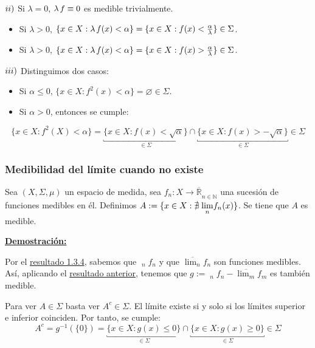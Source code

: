 \documentclass[12pt,a4paper]{article}
\newcommand{\R}{\mathbb{R}}
\newcommand{\N}{\mathbb{N}}
\newcommand{\linf}[1]{\displaystyle{\mathop{\underline{\lim}}_{#1}}}
\newcommand{\mlim}[1]{\displaystyle{\lim_{#1}}}
\newcounter{unit}[section]
\newcounter{chapter}[unit]
\renewcommand{\theunit}{\arabic{unit}}
\renewcommand{\thechapter}{\arabic{chapter}}
\renewcommand{\thesubsubsection}{\theunit.\thechapter.\arabic{subsubsection}}
\newcommand{\result}[1]{%
  \subsubsection{#1}%
  \label{result:\thesubsubsection}
}
\newcommand{\dem}{
    \noindent \underline{\textbf{Demostración:}}
}
\begin{document}
\vspace{2mm}
$\romannumeral 2)$ Si $\lambda = 0$, $\lambda \hspace{0.5mm} f \equiv 0$ es medible trivialmente.
\begin{itemize}
    \item Si $\lambda > 0$, $\{x \in X : \lambda \hspace{0.5mm} f(x) < \alpha\} = \{x \in X : f(x) < \frac{\alpha}{\lambda}\} \in \Sigma$.
    \item Si $\lambda > 0$, $\{x \in X : \lambda \hspace{0.5mm} f(x) < \alpha\} = \{x \in X : f(x) > \frac{\alpha}{\lambda}\} \in \Sigma$.
\end{itemize}

$\romannumeral 3)$ Distinguimos dos casos:
\begin{itemize}
    \item \hspace{-3mm}  Si $\alpha \leq 0$, $\{x \in X : f^2(x) < \alpha\} = \varnothing \in \Sigma$.
    \item Si $\alpha > 0$, entonces se cumple:
\end{itemize}
\vspace{-1ex}
$$\{x \in X : f^2(X) < \alpha\} = \underbracket{\{x \in X : f(x) < \sqrt{\alpha}\}}_{\in \Sigma} \cap \underbracket{\{x \in X : f(x) > - \sqrt{\alpha}\}}_{\in \Sigma} \in \Sigma$$

\vspace{6mm}    
\result{Medibilidad del límite cuando no existe}
Sea $(X, \Sigma, \mu)$ un espacio de medida, sea ${f_n : X \to \overline{\R}}_{n\in\N}$ una sucesión de funciones medibles en él.
Definimos $A := \{x \in X : \nexists \hspace{1mm} \mlim{n}f_n(x)\}$. Se tiene que $A$ es medible.

\vspace{2mm} \dem

\vspace{2mm} Por el \hyperref[result:1.3.4]{resultado 1.3.4}, sabemos que $\linf{n} f_n$ y que $\overline{\mlim{n}}f_n$ son funciones medibles.
Así, aplicando el \hyperref[result:1.3.5]{resultado anterior}, tenemos que $g := \linf{n} f_n - \overline{\mlim{m}}f_m$ es también medible.

\vspace{2mm} Para ver $A \in \Sigma$ basta ver $A^c \in \Sigma$. El límite existe si y solo si los límites superior e inferior coinciden. Por tanto, se cumple: \vspace{-2ex}
$$A^c = g^{-1}(\{0\}) = \underbracket{\{x \in X : g(x) \leq 0\}}_{\in \Sigma} \cap \underbracket{\{x \in X : g(x) \geq 0\}}_{\in \Sigma} \in \Sigma$$
\end{document}
